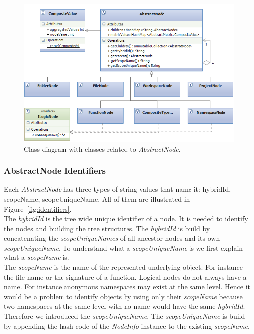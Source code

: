 \documentclass[11pt,a4paper,oneside]{scrreprt}
\begin{document}
\begin{figure}[th]
\begin{center}
\includegraphics[width=\textwidth]{figures/model_tree.png}
\end{center}
\caption{Class diagram with classes related to \textit{AbstractNode}.}
\label{fig:model_tree}
\end{figure}

\subsubsection{AbstractNode Identifiers}
Each \textit{AbstractNode} has three types of string values that name it: hybridId, scopeName, scopeUniqueName. All of them are illustrated in Figure~\ref{fig:identifiers}.\\
The \textit{hybridId} is the tree wide unique identifier of a node. It is needed to identify the nodes and building the tree structures. The \textit{hybridId} is build by concatenating the \textit{scopeUniqueNames} of all ancestor nodes and its own \textit{scopeUniqueName}. To understand what a \textit{scopeUniqueName} is we first explain what a \textit{scopeName} is.\\
The \textit{scopeName} is the name of the represented underlying object. For instance the file name or the signature of a function. Logical nodes do not always have a name. For instance anonymous namespaces may exist at the same level. Hence it would be a problem to identify objects by using only their \textit{scopeName} because two namespaces at the same level with no name would have the same \textit{hybridId}.\\
Therefore we introduced the \textit{scopeUniqueName}. The \textit{scopeUniqueName} is build by appending the hash code of the \textit{NodeInfo} instance to the existing \textit{scopeName}.\\
\end{document}
